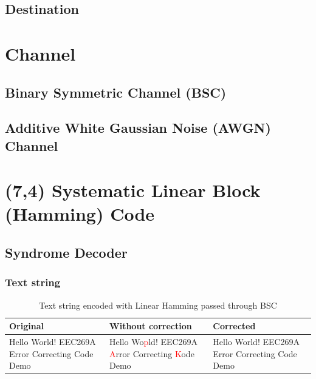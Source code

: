 \documentclass{article}
\begin{document}
\subsection{Destination}





\section{Channel}

\subsection{Binary Symmetric Channel (BSC)}











\subsection{Additive White Gaussian Noise (AWGN) Channel}










\section{(7,4) Systematic Linear Block (Hamming) Code}
\subsection{Syndrome Decoder}
\subsubsection{Text string}

\begin{table}[htb]
    \centering
    \caption{Text string encoded with Linear Hamming passed through BSC}
    \label{tab:text-linear-bsc}
    \renewcommand{\arraystretch}{1.5}
    \begin{tabulary}{\textwidth}{ |L|L|L| } 
    \hline
    \textbf{Original} & \textbf{Without correction} & \textbf{Corrected} \\
    \hline
    Hello World! EEC269A Error Correcting Code Demo & Hello Wo\textcolor{red}{p}ld! EEC269A \textcolor{red}{A}rror Correcting \textcolor{red}{K}ode Demo & Hello World! EEC269A Error Correcting Code Demo \\
    \hline
    \end{tabulary}
\end{table}
\end{document}
